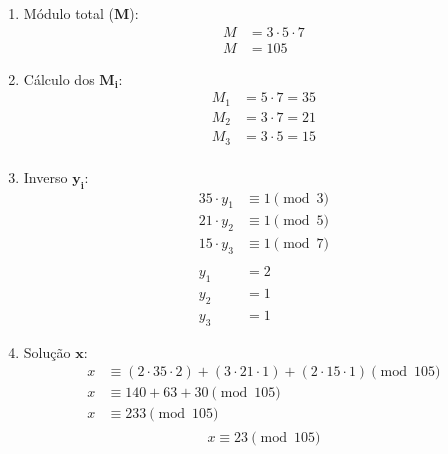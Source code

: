 \begin{enumerate}
    \item Módulo total ($\mathbf{M}$):
          \begin{align*}
              M & = 3 \cdot 5 \cdot 7 \\
              M & = 105
          \end{align*}
    \item Cálculo dos $\mathbf{M_i}$:
          \begin{align*}
              M_1 & = 5 \cdot 7 = 35 \\
              M_2 & = 3 \cdot 7 = 21 \\
              M_3 & = 3 \cdot 5 = 15 \\
          \end{align*}
    \item Inverso $\mathbf{y_i}$:
          \begin{align*}
              35 \cdot y_1 & \equiv 1 \pmod 3 \\
              21 \cdot y_2 & \equiv 1 \pmod 5 \\
              15 \cdot y_3 & \equiv 1 \pmod 7 \\
              \\
              y_1          & = 2              \\
              y_2          & = 1              \\
              y_3          & = 1
          \end{align*}
    \item Solução $\mathbf{x}$:
          \begin{align*}
              x & \equiv (2 \cdot 35 \cdot 2) + (3 \cdot 21 \cdot 1) + (2 \cdot 15 \cdot 1) \pmod{105} \\
              x & \equiv 140 + 63 + 30 \pmod {105}                                                     \\
              x & \equiv 233 \pmod {105}                                                               \\
          \end{align*}
          \[
              \boxed{
                  x \equiv 23 \pmod {105}
              }
          \]
\end{enumerate}